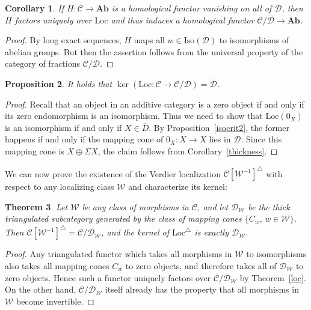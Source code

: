 \documentclass{amsproc}
\newtheorem{prop}{Proposition}[section]
\newtheorem{thm}[prop]{Theorem}
\newtheorem{cor}[prop]{Corollary}
\theoremstyle{definition}
\begin{document}
\begin{cor}
\label{localhomfunctor}
If $H:{\mathcal{C}}{\longrightarrow}{\mathbf{Ab}}$ is a homological functor vanishing on all of ${\mathcal{D}}$, then $H$ factors uniquely over ${\mathrm{Loc}}$ and thus induces a homological functor ${\mathcal{C}}/{\mathcal{D}}{\longrightarrow}{\mathbf{Ab}}$.
\end{cor}

\begin{proof}
By long exact sequences, $H$ maps all $w\in{\mathrm{Iso}}({\mathcal{D}})$ to isomorphisms of abelian groups. But then the assertion follows from the universal property of the category of fractions ${\mathcal{C}}/{\mathcal{D}}$.
\end{proof}

\begin{prop}
\label{verdierkernel}
It holds that $\ker({\mathrm{Loc}}:{\mathcal{C}}{\longrightarrow}{\mathcal{C}}/{\mathcal{D}})=\overline{\mathcal{D}}$.
\end{prop}

\begin{proof}
Recall that an object in an additive category is a zero object if and only if its zero endomorphism is an isomorphism. Thus we need to show that ${\mathrm{Loc}}(0_X)$ is an isomorphism if and only if $X\in\overline{D}$. By Proposition~\ref{isocrit2}, the former happens if and only if the mapping cone of $0_X:X{\longrightarrow} X$ lies in ${\mathcal{D}}$. Since this mapping cone is $X\oplus\Sigma X$, the claim follows from Corollary~\ref{thickness}.
\end{proof}

We can now prove the existence of the Verdier localization ${\mathcal{C}}[{\mathcal{W}}^{-1}]^\triangle$ with respect to any localizing class ${\mathcal{W}}$ and characterize its kernel:

\begin{thm}
\label{mainthm}
Let ${\mathcal{W}}$ be any class of morphisms in ${\mathcal{C}}$, and let ${\mathcal{D}}_{\mathcal{W}}$ be the thick triangulated subcategory generated by the class of mapping cones $\{C_w,\,w\in{\mathcal{W}}\}$. Then ${\mathcal{C}}[{\mathcal{W}}^{-1}]^\triangle={\mathcal{C}}/{\mathcal{D}}_{\mathcal{W}}$, and the kernel of ${\mathrm{Loc}}^\triangle$ is exactly ${\mathcal{D}}_{\mathcal{W}}$.
\end{thm}

\begin{proof}
Any triangulated functor which takes all morphisms in ${\mathcal{W}}$ to isomorphisms also takes all mapping cones $C_w$ to zero objects, and therefore takes all of ${\mathcal{D}}_{\mathcal{W}}$ to zero objects. Hence such a functor uniquely factors over ${\mathcal{C}}/{\mathcal{D}}_{\mathcal{W}}$ by Theorem~\ref{loc}. On the other hand, ${\mathcal{C}}/{\mathcal{D}}_{\mathcal{W}}$ itself already has the property that all morphisms in ${\mathcal{W}}$ become invertible.
\end{proof}
\end{document}
